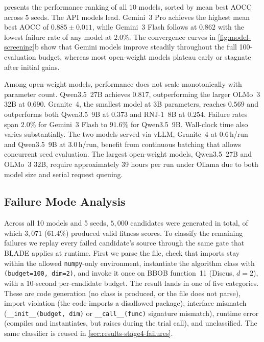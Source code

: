  presents the performance ranking of all 10 models, sorted by mean best AOCC across 5 seeds. The API models lead. Gemini~3 Pro achieves the highest mean best AOCC of $0.885 \pm 0.011$, while Gemini~3 Flash follows at $0.862$ with the lowest failure rate of any model at $2.0\%$. The convergence curves in \cref{fig:model-screening}b show that Gemini models improve steadily throughout the full 100-evaluation budget, whereas most open-weight models plateau early or stagnate after initial gains.

Among open-weight models, performance does not scale monotonically with parameter count. Qwen3.5~27B achieves $0.817$, outperforming the larger OLMo~3 32B at $0.690$. Granite~4, the smallest model at 3B parameters, reaches $0.569$ and outperforms both Qwen3.5~9B at $0.373$ and RNJ-1~8B at $0.254$. Failure rates span $2.0\%$ for Gemini~3 Flash to $91.6\%$ for Qwen3.5~9B. Wall-clock time also varies substantially. The two models served via vLLM, Granite~4 at 0.6\,h/run and Qwen3.5~9B at 3.0\,h/run, benefit from continuous batching that allows concurrent seed evaluation. The largest open-weight models, Qwen3.5~27B and OLMo~3 32B, require approximately 39 hours per run under Ollama due to both model size and serial request queuing.

\subsection{Failure Mode Analysis}
\label{sec:results-failures}


Across all 10 models and 5 seeds, $5{,}000$ candidates were generated in total, of which $3{,}071$ ($61.4\%$) produced valid fitness scores. To classify the remaining failures we replay every failed candidate's source through the same gate that BLADE applies at runtime. First we parse the file, check that imports stay within the allowed \texttt{numpy}-only environment, instantiate the algorithm class with \texttt{(budget=100, dim=2)}, and invoke it once on BBOB function~11 (Discus, $d = 2$), with a 10-second per-candidate budget. The result lands in one of five categories. These are code generation (no class is produced, or the file does not parse), import violation (the code imports a disallowed package), interface mismatch (\texttt{\_\_init\_\_(budget, dim)} or \texttt{\_\_call\_\_(func)} signature mismatch), runtime error (compiles and instantiates, but raises during the trial call), and unclassified. The same classifier is reused in \cref{sec:results-stage4-failures}.

